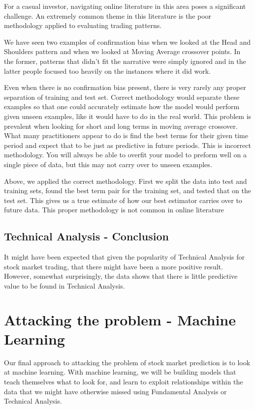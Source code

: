 \documentclass{report}
\begin{document}
For a casual investor, navigating online literature in this area poses a significant challenge. An extremely common theme in this literature is the poor methodology applied to evaluating trading patterns.

We have seen two examples of confirmation bias when we looked at the Head and Shoulders pattern and when we looked at Moving Average crossover points. In the former, patterns that didn't fit the narrative were simply ignored and in the latter people focused too heavily on the instances where it did work.

Even when there is no confirmation bias present, there is very rarely any proper separation of training and test set. Correct methodology would separate these examples so that one could accurately estimate how the model would perform given unseen examples, like it would have to do in the real world. This problem is prevalent when looking for short and long terms in moving average crossover. What many practitioners appear to do is find the best terms for their given time period and expect that to be just as predictive in future periods. This is incorrect methodology. You will always be able to overfit your model to preform well on a single piece of data, but this may not carry over to unseen examples.

Above, we applied the correct methodology. First we split the data into test and training sets, found the best term pair for the training set, and tested that on the test set. This gives us a true estimate of how our best estimator carries over to future data. This proper methodology is not common in online literature


\section{Technical Analysis - Conclusion}

It might have been expected that given the popularity of Technical Analysis for stock market trading, that there might have been a more positive result. However, somewhat surprisingly, the data shows that there is little predictive value to be found in Technical Analysis. 

\chapter{Attacking the problem - Machine Learning}

Our final approach to attacking the problem of stock market prediction is to look at machine learning. With machine learning, we will be building models that teach themselves what to look for, and learn to exploit relationships within the data that we might have otherwise missed using Fundamental Analysis or Technical Analysis.
\end{document}
